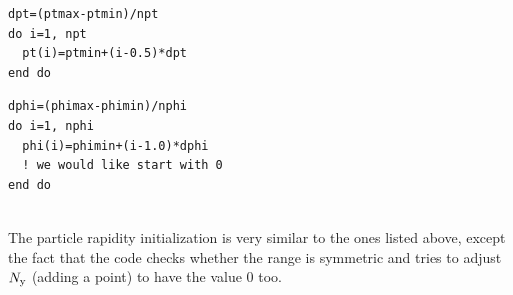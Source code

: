 \begin{minipage}{0.4\textwidth}
 \begin{lstlisting}
dpt=(ptmax-ptmin)/npt
do i=1, npt
  pt(i)=ptmin+(i-0.5)*dpt
end do
\end{lstlisting}
\end{minipage}
\hspace{0.05\textwidth}
\begin{minipage}{0.4\textwidth}
 \begin{lstlisting}
dphi=(phimax-phimin)/nphi
do i=1, nphi
  phi(i)=phimin+(i-1.0)*dphi 
  ! we would like start with 0
end do
\end{lstlisting}
\end{minipage}\\
The particle rapidity initialization is very similar to the ones listed above, 
except the fact that the code checks whether the range is symmetric and tries 
to adjust $N_{\mathrm{y}}$ (adding a point) to have the value 0 too.





